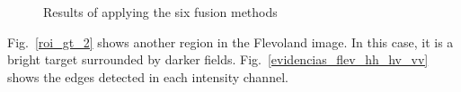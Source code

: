 \documentclass[journal]{IEEEtran}
\begin{document}
\begin{figure}[hbt]
     \caption{Results of applying the six fusion methods}
     \label{fusion_met}
\end{figure}

Fig.~\ref{roi_gt_2} shows another region in the Flevoland image.
In this case, it is a bright target surrounded by darker fields.
Fig.~\ref{evidencias_flev_hh_hv_vv} shows the edges detected in each intensity channel.
\end{document}
